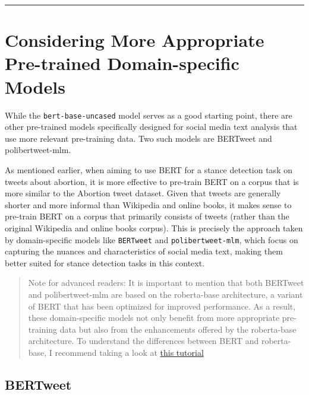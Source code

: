 \documentclass[11pt]{article}
\begin{document}
    \begin{center}\rule{0.5\linewidth}{0.5pt}\end{center}

    \hypertarget{considering-more-appropriate-pre-trained-domain-specific-models}{%
\section{Considering More Appropriate Pre-trained Domain-specific
Models}\label{considering-more-appropriate-pre-trained-domain-specific-models}}

While the \texttt{bert-base-uncased} model serves as a good starting
point, there are other pre-trained models specifically designed for
social media text analysis that use more relevant pre-training data. Two
such models are BERTweet and polibertweet-mlm.

As mentioned earlier, when aiming to use BERT for a stance detection
task on tweets about abortion, it is more effective to pre-train BERT on
a corpus that is more similar to the Abortion tweet dataset. Given that
tweets are generally shorter and more informal than Wikipedia and online
books, it makes sense to pre-train BERT on a corpus that primarily
consists of tweets (rather than the original Wikipedia and online books
corpus). This is precisely the approach taken by domain-specific models
like \texttt{BERTweet} and \texttt{polibertweet-mlm}, which focus on
capturing the nuances and characteristics of social media text, making
them better suited for stance detection tasks in this context.

    \begin{quote}
Note for advanced readers: It is important to mention that both BERTweet
and polibertweet-mlm are based on the roberta-base architecture, a
variant of BERT that has been optimized for improved performance. As a
result, these domain-specific models not only benefit from more
appropriate pre-training data but also from the enhancements offered by
the roberta-base architecture. To understand the differences between
BERT and roberta-base, I recommend taking a look at
\href{https://appliedsingularity.com/2022/03/29/nlp-tutorials-part-14-roberta/}{this
tutorial}
\end{quote}

    \hypertarget{bertweet}{%
\subsection{BERTweet}\label{bertweet}}
\end{document}
